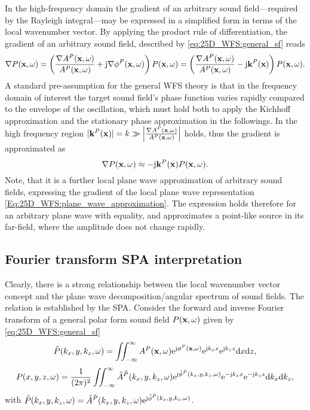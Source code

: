 In the high-frequency domain the gradient of an arbitrary sound field---required by the Rayleigh integral---may be expressed in a simplified form in terms of the local wavenumber vector.
By applying the product rule of differentiation, the gradient of an arbitrary sound field, described by \eqref{eq:25D_WFS:general_sf} reads
\begin{equation}
\nabla P(\mathbf{x},\omega) = \left(  \frac{\nabla A^P(\mathbf{x},\omega)}{A^P(\mathbf{x},\omega)} + \mathrm{j} \nabla \phi^P(\mathbf{x},\omega) \right) P(\mathbf{x},\omega) =  \left(  \frac{\nabla A^P(\mathbf{x},\omega)}{A^P(\mathbf{x},\omega)} - \mathrm{j} \mathbf{k}^P(\mathbf{x}) \right) P(\mathbf{x},\omega).
\end{equation}
A standard pre-assumption for the general WFS theory is that in the frequency domain of interest the target sound field's phase function varies rapidly compared to the envelope of the oscillation, which must hold both to apply the Kichhoff approximation and the stationary phase approximation in the followings.
In the high frequency region $|\mathbf{k}^P(\mathbf{x})| = k \gg \left| \frac{ \nabla A^P(\mathbf{x},\omega)}{A^P(\mathbf{x},\omega)} \right|$ holds, thus the gradient is approximated as
\begin{equation}
\nabla P(\mathbf{x},\omega) \approx - \mathrm{j} \mathbf{k}^P(\mathbf{x}) P(\mathbf{x},\omega).
\label{eq:25D_WFS:gradient_appr}
\end{equation}
Note, that it is a further local plane wave approximation of arbitrary sound fields, expressing the gradient of the local plane wave representation \eqref{Eq:25D_WFS:plane_wave_approximation}.
The expression holds therefore for an arbitrary plane wave with equality, and approximates a point-like source in its far-field, where the amplitude does not change rapidly.


\subsection{Fourier transform SPA interpretation}
Clearly, there is a strong relationship between the local wavenumber vector concept and the plane wave decomposition/angular spectrum of sound fields.
The relation is established by the SPA.
Consider the forward and inverse Fourier transform of a general polar form sound field $P(\mathbf{x},\omega)$ given by \eqref{eq:25D_WFS:general_sf}
\begin{equation}
\tilde{P}(k_x,y,k_z,\omega) = \iint_{-\infty}^{\infty} A^P(\mathbf{x},\omega)\mathrm{e}^{\mathrm{j} \phi^P(\mathbf{x},\omega)} \mathrm{e}^{\mathrm{j} k_x x} \mathrm{e}^{\mathrm{j} k_z z} \mathrm{d} x \mathrm{d} z,
\label{eq:forward_transform}
\end{equation}
\begin{equation}
P(x,y,z,\omega) = \frac{1}{(2\pi)^2} \iint_{-\infty}^{\infty} \tilde{A}^{\tilde{P}}(k_x,y,k_z,\omega)\mathrm{e}^{\mathrm{j} \tilde{\phi}^{\tilde{P}}(k_x,y,k_z,\omega)}  \mathrm{e}^{-\mathrm{j} k_x x} \mathrm{e}^{-\mathrm{j} k_z z} \mathrm{d} k_x \mathrm{d} k_z,
\label{eq:inverse_transform}
\end{equation}
with $\tilde{P}(k_x,y,k_z,\omega) =\tilde{A}^{\tilde{P}}(k_x,y,k_z,\omega)\mathrm{e}^{\mathrm{j} \tilde{\phi}^{\tilde{P}}(k_x,y,k_z,\omega)}$.

